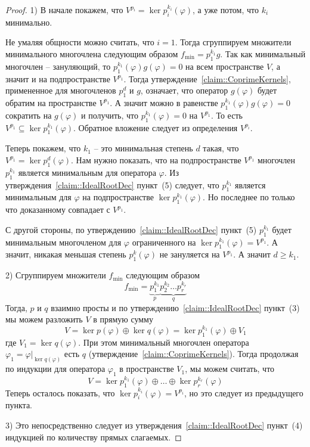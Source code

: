 \begin{proof}
1) В начале покажем, что $V^{p_i} = \ker p_i^{k_i}(\varphi)$, а уже потом, что $k_i$ минимально.

Не умаляя общности можно считать, что $i = 1$.
Тогда сгруппируем множители минимального многочлена следующим образом $f_\text{min} = p_1^{k_1} g$.
Так как минимальный многочлен -- зануляющий, то $p_1^{k_1}(\varphi)g(\varphi) = 0$ на всем пространстве $V$, а значит и на подпространстве $V^{p_1}$.
Тогда утверждение~\ref{claim::CoprimeKernels}, примененное для многочленов $p_1^d$ и $g$, означает, что оператор $g(\varphi)$ будет обратим на пространстве $V^{p_1}$.
А значит можно в равенстве $p_1^{k_1}(\varphi)g(\varphi) = 0$  сократить на $g(\varphi)$ и получить, что $p_1^{k_1}(\varphi) = 0$ на $V^{p_1}$.
То есть $V^{p_1}\subseteq \ker p_1^{k_1}(\varphi)$.
Обратное вложение следует из определения $V^{p_i}$.

Теперь покажем, что $k_1$ -- это минимальная степень $d$ такая, что $V^{p_1} = \ker p_1^d(\varphi)$.
Нам нужно показать, что на подпространстве $V^{p_1}$ многочлен $p_1^{k_1}$ является минимальным для оператора $\varphi$.
Из утверждения~\ref{claim::IdealRootDec} пункт~(5) следует, что $p_1^{k_1}$ является минимальным для $\varphi$ на подпространстве $\ker p_1^{k_1}(\varphi)$.
Но последнее по только что доказанному совпадает с $V^{p_1}$.


С другой стороны, по утверждению~\ref{claim::IdealRootDec} пункт~(5) $p_1^{k_1}$ будет минимальным многочленом для $\varphi$ ограниченного на $\ker p_1^{k_1}(\varphi) = V^{p_1}$.
А значит, никакая меньшая степень $p_1^k(\varphi)$ не зануляется на $V^{p_1}$.
А значит $d \geqslant k_1$.

2) Сгруппируем множители $f_\text{min}$ следующим образом
\[
f_\text{min} = \underbrace{p_1^{k_1}}_{p}\underbrace{p_2^{k_2}\ldots p_r^{k_r}}_{q}
\]
Тогда, $p$ и $q$ взаимно просты и по утверждению~\ref{claim::IdealRootDec} пункт~(3) мы можем разложить $V$ в прямую сумму 
\[
V = \ker p(\varphi) \oplus \ker q(\varphi) = \ker p_1^{k_1}(\varphi) \oplus V_1
\]
где $V_1 = \ker q(\varphi)$.
При этом минимальный многочлен оператора $\varphi_1 = \varphi|_{\ker q(\varphi)}$ есть $q$ (утверждение~\ref{claim::CoprimeKernels}).
Тогда продолжая по индукции для оператора $\varphi_1$ в пространстве $V_1$, мы можем считать, что
\[
V = \ker p_1^{k_1}(\varphi)\oplus \ldots \oplus \ker p_r^{k_r}(\varphi)
\]
Теперь осталось показать, что $\ker p_i^{k_i}(\varphi) =  V^{p_i}$, но это следует из предыдущего пункта.

3) Это непосредственно следует из утверждения~\ref{claim::IdealRootDec} пункт~(4) индукцией по количеству прямых слагаемых.
\end{proof}

